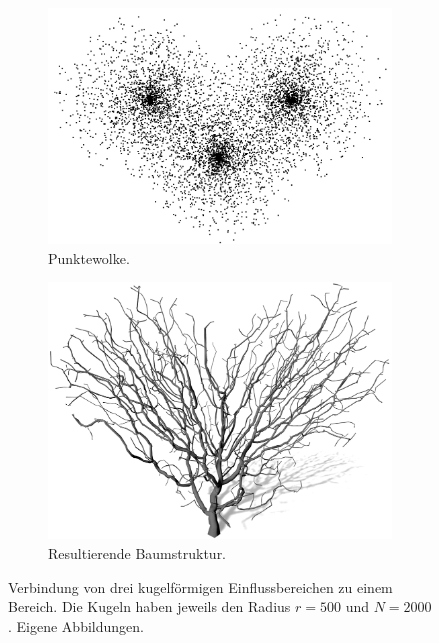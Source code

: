  \begin{figure} [hbtp]
 	\centering
 	\begin{subfigure}[t]{.45\textwidth}
 		\centering
 		\includegraphics[height=.21\textheight]{images/SCA_MultipleSpheres_Points.png}
 		\caption{Punktewolke.}
 		\label{subfig:SCA_MultipleSpheres_Points}
 	\end{subfigure}
 	\hspace{.05\linewidth}
 	\begin{subfigure}[t]{.45\textwidth}
 		\centering
 		\includegraphics[height=.21\textheight]{images/SCA_MultipleSpheres_Grown.png}
 		\caption{Resultierende Baumstruktur.}
 		\label{subfig:SCA_MultipleSpheres_Grown}
 	\end{subfigure}	
 	\caption{Verbindung von drei kugelförmigen Einflussbereichen zu einem Bereich. Die Kugeln haben jeweils den Radius $r=500$ und $N=2000$. Eigene Abbildungen.}
 	\label{fig:SCA_MultipleSpheres}
 \end{figure}
 
